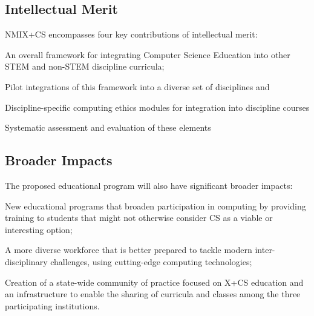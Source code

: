 \subsection{Intellectual Merit} 
NMIX+CS encompasses four key contributions of intellectual merit:
\begin{tightenumerate}
\item An overall framework for integrating Computer Science Education into other STEM and non-STEM discipline curricula;
\item Pilot integrations of this framework into a diverse set of disciplines and 
\item Discipline-specific computing ethics modules for integration into discipline courses
\item Systematic assessment and evaluation of these elements
\end{tightenumerate}

\subsection{Broader Impacts} 
The proposed educational program will also have significant broader impacts:
\begin{tightenumerate}
    \item New educational programs that broaden participation in computing by providing  training to students that might not otherwise consider CS as a viable or interesting option;
    \item A more diverse workforce that is better prepared to tackle modern inter-disciplinary challenges, using cutting-edge computing technologies;
    \item Creation of a state-wide community of practice focused on X+CS education and an infrastructure to enable the sharing of curricula and classes among the three participating institutions. 
\end{tightenumerate}

 



